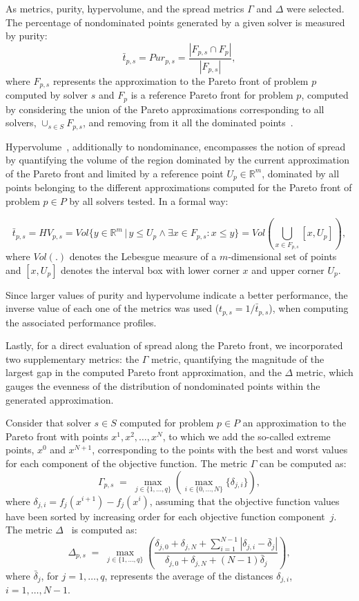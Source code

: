 \documentclass[12pt]{article}
\begin{document}
As metrics, purity, hypervolume, and the spread metrics $\Gamma$
and $\Delta$ were selected. The percentage of nondominated points
generated by a given solver is measured by purity:
$$\bar{t}_{p,s}={Pur}_{p,s}=\frac{|F_{p,s} \cap F_{p}|}{|F_{p,s}|},$$
where $ F_{p,s} $ represents the approximation to the Pareto front
of problem $p$ computed by solver $s$ and $ F_{p} $ is a reference
Pareto front for problem $p$, computed by considering the union of
the Pareto approximations corresponding to all solvers, $ \cup_{s
\in S} F_{p,s} $, and removing from it all the dominated
points~\cite{custodio2011}.

Hypervolume~\cite{EZitzler_et_al_2003}, additionally to
nondominance, encompasses the notion of spread by quantifying the
volume of the region dominated by the current approximation of the
Pareto front and limited by a reference point $U_p \in
\mathbb{R}^m$, dominated by all points belonging to the different
approximations computed for the Pareto front of problem $p\in P$
by all solvers tested. In a formal way:

$$\bar{t}_{p,s}=HV_{p,s} =  Vol\{y \in \mathbb{R}^m\,| \, y \le U_p \wedge \exists x \in F_{p,s} : x \le y\} = Vol \left(\bigcup_{x \in F_{p,s}} [x, U_p]\right),$$
where $Vol(.)$ denotes the Lebesgue measure of a $m$-dimensional
set of points and $[x, U_p]$ denotes the interval box with lower
corner $x$ and upper corner $U_p$.

Since larger values of purity and hypervolume indicate a better
performance, the inverse value of each one of the metrics was used
($t_{p,s}=1/ \bar{t}_{p,s}$), when computing the associated
performance profiles.

Lastly, for a direct evaluation of spread along the Pareto front,
we incorporated two supplementary metrics: the $\Gamma$ metric,
quantifying the magnitude of the largest gap in the computed
Pareto front approximation, and the $\Delta$ metric, which gauges
the evenness of the distribution of nondominated points within the
generated approximation.

Consider that solver $s \in S$ computed for problem $p \in P$ an
approximation to the Pareto front with points
$x^1,x^2,\ldots,x^N$, to which we add the so-called extreme
points, $x^0$ and $x^{N+1}$, corresponding to the points with the
best and worst values for each component of the objective
function. The metric $\Gamma$ can be computed as:
\begin{equation}
 \Gamma_{p,s} \; = \; \max_{j \in
\{1,\dots,q\}}\left(\max_{i\in
\{0,\dots,N\}}\{\delta_{j,i}\}\right),
\end{equation}
\noindent where $\delta_{j,i}=f_{j}(x^{i+1})-f_{j}(x^i)$, assuming
that the objective function values have been sorted by increasing
order for each objective function component~$j$. The metric
$\Delta$~\cite{KDeb_et_al_2002} is computed as:
\begin{equation}\displaystyle \Delta_{p,s} \;
= \;
\max_{j\in\{1,\dots,q\}}\left(\frac{\delta_{j,0}+\delta_{j,N}+\sum_{i=1}^{N-1}|\delta_{j,i}-
\bar{\delta}_j|}{\delta_{j,0}+\delta_{j,N}+(N-1)\bar{\delta}_j}\right),
\end{equation}
where $\bar{\delta}_j$, for $j=1,\ldots,q$, represents the average
of the distances $\delta_{j,i}$, $i=1,\dots,N-1$.
\end{document}
